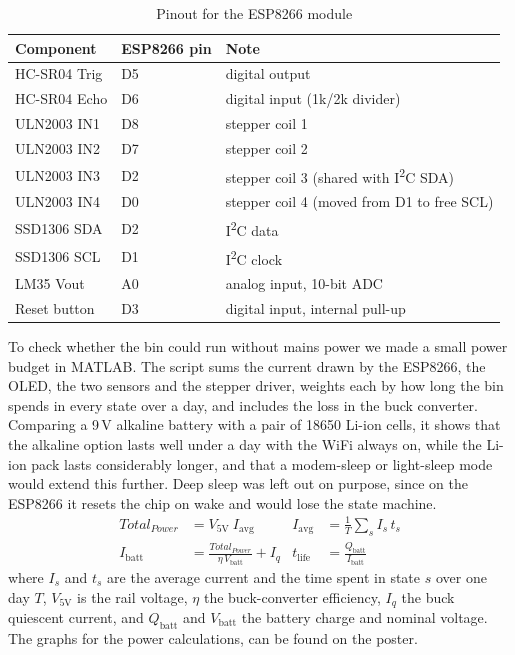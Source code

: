 \documentclass{article}
\begin{document}
\begin{table}[H]
    \centering
    \begin{tabular}{l|l|l}
        \textbf{Component} & \textbf{ESP8266 pin} & \textbf{Note} \\
        \hline
        HC-SR04 Trig     & D5  & digital output \\
        HC-SR04 Echo     & D6  & digital input (1k/2k divider) \\
        ULN2003 IN1      & D8  & stepper coil 1 \\
        ULN2003 IN2      & D7  & stepper coil 2 \\
        ULN2003 IN3      & D2  & stepper coil 3 (shared with I\textsuperscript{2}C SDA) \\
        ULN2003 IN4      & D0  & stepper coil 4 (moved from D1 to free SCL) \\
        SSD1306 SDA      & D2  & I\textsuperscript{2}C data \\
        SSD1306 SCL      & D1  & I\textsuperscript{2}C clock \\
        LM35 Vout        & A0  & analog input, 10-bit ADC \\
        Reset button     & D3  & digital input, internal pull-up \\
    \end{tabular}
    \caption{Pinout for the ESP8266 module}
    \label{tab:pinout}
\end{table}
\noindent
\noindent To check whether the bin could run without mains power we made a small power budget in MATLAB. The script sums the current drawn by the ESP8266, the OLED, the two sensors and the stepper driver, weights each by how long the bin spends in every state over a day, and includes the loss in the buck converter. Comparing a 9\,V alkaline battery with a pair of 18650 Li-ion cells, it shows that the alkaline option lasts well under a day with the WiFi always on, while the Li-ion pack lasts considerably longer, and that a modem-sleep or light-sleep mode would extend this further. Deep sleep was left out on purpose, since on the ESP8266 it resets the chip on wake and would lose the state machine.
\begin{align*}
Total_{Power} &= V_{5\text{V}}\ I_{\text{avg}} & I_{\text{avg}} &= \frac{1}{T}\sum_{s} I_{s}\, t_{s} \\
I_{\text{batt}} &= \frac{Total_{Power}}{\eta\, V_{\text{batt}}} + I_{q} & t_{\text{life}} &= \frac{Q_{\text{batt}}}{I_{\text{batt}}}
\end{align*}
\noindent where $I_{s}$ and $t_{s}$ are the average current and the time spent in state $s$ over one day $T$, $V_{5\text{V}}$ is the rail voltage, $\eta$ the buck-converter efficiency, $I_{q}$ the buck quiescent current, and $Q_{\text{batt}}$ and $V_{\text{batt}}$ the battery charge and nominal voltage.
\noindent The graphs for the power calculations, can be found on the poster.
\ifdefined\mainfile\else
\end{document}
